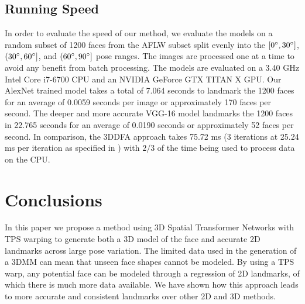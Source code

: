 \documentclass[10pt,twocolumn,letterpaper]{article}
\begin{document}
\subsection{Running Speed}
In order to evaluate the speed of our method, we evaluate the models on a random subset of 1200 faces from the AFLW subset split evenly into the $[0\degree, 30\degree]$, $(30\degree, 60\degree]$, and $(60\degree, 90\degree]$ pose ranges. The images are processed one at a time to avoid any benefit from batch processing. The models are evaluated on a 3.40 GHz Intel Core i7-6700 CPU and an NVIDIA GeForce GTX TITAN X GPU. Our AlexNet trained model takes a total of 7.064 seconds to landmark the 1200 faces for an average of 0.0059 seconds per image or approximately 170 faces per second. The deeper and more accurate VGG-16 model landmarks the 1200 faces in 22.765 seconds for an average of 0.0190 seconds or approximately 52 faces per second. In comparison, the 3DDFA approach \cite{Zhu16falp} takes 75.72 ms (3 iterations at 25.24 ms per iteration as specified in \cite{Zhu16falp}) with $2/3$ of the time being used to process data on the CPU. 

\section{Conclusions}
In this paper we propose a method using 3D Spatial Transformer Networks with TPS warping to generate both a 3D model of the face and accurate 2D landmarks across large pose variation. The limited data used in the generation of a 3DMM can mean that unseen face shapes cannot be modeled. By using a TPS warp, any potential face can be modeled through a regression of 2D landmarks, of which there is much more data available. We have shown how this approach leads to more accurate and consistent landmarks over other 2D and 3D methods.

{\small


}
\end{document}
